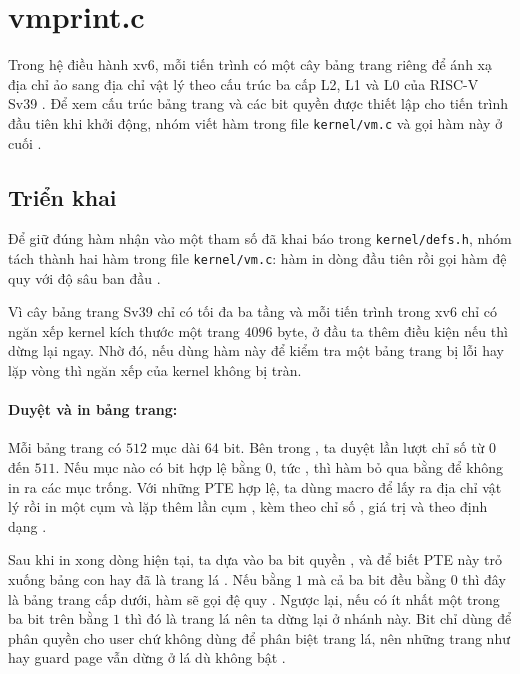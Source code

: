 \section{vmprint.c}
Trong hệ điều hành xv6, mỗi tiến trình có một cây bảng trang riêng để
ánh xạ địa chỉ ảo sang địa chỉ vật lý theo cấu trúc ba cấp L2, L1 và
L0 của RISC-V Sv39 \cite{xv6book,riscvspec}. Để xem cấu trúc bảng trang
và các bit quyền được thiết lập cho tiến trình đầu tiên khi khởi động,
nhóm viết hàm  trong file
\texttt{kernel/vm.c} và gọi hàm này ở cuối 
\cite{hcmus_os_lab3,mitpgtbl}.

\subsection{Triển khai}
Để giữ đúng hàm nhận vào một tham số 
đã khai báo trong \texttt{kernel/defs.h}, nhóm tách thành hai hàm trong
file \texttt{kernel/vm.c}: hàm  in dòng đầu tiên
 rồi gọi hàm đệ quy  với độ
sâu ban đầu  \cite{xv6vm}.

Vì cây bảng trang Sv39 chỉ có tối đa ba tầng và mỗi tiến trình trong
xv6 chỉ có ngăn xếp kernel  kích thước một trang $4096$
byte, ở đầu  ta thêm điều kiện nếu 
thì dừng lại ngay. Nhờ đó, nếu dùng hàm này để kiểm tra một bảng trang
bị lỗi hay lặp vòng thì ngăn xếp của kernel không bị tràn.

\paragraph*{Duyệt và in bảng trang:} Mỗi bảng trang có $512$ mục
 dài $64$ bit. Bên trong , ta duyệt
lần lượt chỉ số  từ $0$ đến $511$. Nếu mục nào có bit hợp lệ
bằng $0$, tức , thì hàm bỏ qua bằng
 để không in ra các mục trống. Với những PTE hợp lệ, ta
dùng macro  để lấy ra địa chỉ vật lý  rồi
in một cụm  và lặp thêm  lần cụm ,
kèm theo chỉ số , giá trị  và  theo định
dạng .

Sau khi in xong dòng hiện tại, ta dựa vào ba bit quyền ,
 và  để biết PTE này trỏ xuống bảng con hay
đã là trang lá \cite{riscvspec}. Nếu  bằng $1$ mà cả ba
bit  đều bằng $0$ thì đây là bảng trang cấp dưới, hàm sẽ
gọi đệ quy . Ngược lại,
nếu có ít nhất một trong ba bit trên bằng $1$ thì đó là trang lá nên ta
dừng lại ở nhánh này. Bit  chỉ dùng để phân quyền cho
user chứ không dùng để phân biệt trang lá, nên những trang như
 hay guard page vẫn dừng ở lá dù không bật .

